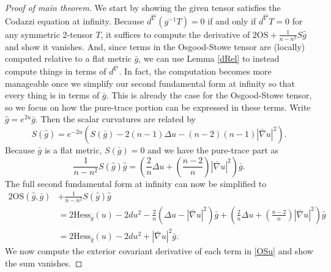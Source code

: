 \documentclass{amsart}
\begin{document}
\begin{proof}[Proof of main theorem]
We start by showing the given tensor satisfies the Codazzi equation at infinity.
Because $d^{\hat{\nabla}}(g^{-1}T) = 0$ if and only if $d^{\hat{\nabla}}T = 0$ for any symmetric 2-tensor $T$, it suffices to compute the derivative of $2\mathrm{OS} + \frac{1}{n-n^2}S\hat{g}$ and show it vanishes.
And, since terms in the Osgood-Stowe tensor are (locally) computed relative to a flat metric $\bar{g}$, we can use Lemma \ref{dRel} to instead compute things in terms of $d^{\bar{\nabla}}$.
In fact, the computation becomes more manageable once we simplify our second fundamental form at infinity so that every thing is in terms of $\bar{g}$.
This is already the case for the Osgood-Stowe tensor, so we focus on how the pure-trace portion can be expressed in these terms. 
Write $\hat{g} = e^{2u}\bar{g}$. 
Then the scalar curvatures are related by 
\[
S(\hat{g}) = e^{-2u}(S(\bar{g}) -2(n-1)\Delta u  - (n-2)(n-1)|\bar{\nabla}u|^2).
\]
Because $\bar{g}$ is a flat metric, $S(\bar{g}) = 0$ and we have the pure-trace part as
\[
\frac{1}{n-n^2}S(\hat{g})\hat{g}
= \left( \frac{2}{n}\Delta u  + \left(\frac{n-2}{n}\right)|\bar{\nabla}u|^2 \right) \bar{g}.
\]
The full second fundamental form at infinity can now be simplified to 
\begin{align}
2\mathrm{OS}(\hat{g},\bar{g}) &+ \frac{1}{n-n^2}S(\hat{g})\hat{g} \nonumber \\
&= 2\mathrm{Hess}_{\bar{g}}(u) - 2du^2 - \frac{2}{n}\left(\Delta u - |\bar{\nabla}u|^2\right)\bar{g} + \left( \frac{2}{n}\Delta u  + \left(\frac{n-2}{n}\right)|\bar{\nabla}u|^2 \right) \bar{g} \nonumber \\
&= 2\mathrm{Hess}_{\bar{g}}(u) - 2 du^2 + |\bar{\nabla}u|^2 \bar{g}. \label{OSu}
\end{align}
We now compute the exterior covariant derivative of each term in \eqref{OSu} and show the sum vanishes. 


\end{proof}
\end{document}

